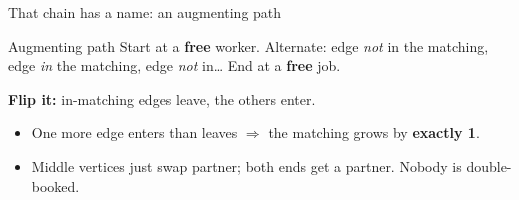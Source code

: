 \documentclass[aspectratio=169,11pt]{beamer}
\begin{document}
\begin{frame}{That chain has a name: an augmenting path}
\begin{block}{Augmenting path}
Start at a \textbf{free} worker. Alternate: edge \emph{not} in the matching, edge \emph{in} the matching, edge \emph{not} in\ldots{} End at a \textbf{free} job.
\end{block}
\vspace{2mm}
\centering
{}

\vspace{4mm}
\raggedright
\textbf{Flip it:} in-matching edges leave, the others enter.
\begin{itemize}\setlength\itemsep{4pt}
  \item One more edge enters than leaves $\Rightarrow$ the matching grows by \textbf{exactly 1}.
  \item Middle vertices just swap partner; both ends get a partner. Nobody is double-booked.
\end{itemize}
\end{frame}
\end{document}
